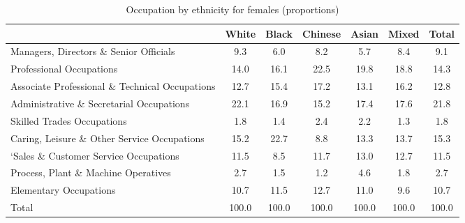 \begin{table}[htbp]\centering
\def\sym#1{\ifmmode^{#1}\else\(^{#1}\)\fi}
\caption{Occupation by ethnicity for females (proportions)}
\begin{tabular}{l*{6}{c}}
\hline\hline
          &    White&    Black&  Chinese&    Asian&    Mixed&    Total\\
\hline
Managers, Directors \& Senior Officials         &      9.3&      6.0&      8.2&      5.7&      8.4&      9.1\\
Professional Occupations         &     14.0&     16.1&     22.5&     19.8&     18.8&     14.3\\
Associate Professional \& Technical Occupations         &     12.7&     15.4&     17.2&     13.1&     16.2&     12.8\\
Administrative \& Secretarial Occupations         &     22.1&     16.9&     15.2&     17.4&     17.6&     21.8\\
Skilled Trades Occupations         &      1.8&      1.4&      2.4&      2.2&      1.3&      1.8\\
Caring, Leisure \& Other Service Occupations         &     15.2&     22.7&      8.8&     13.3&     13.7&     15.3\\
‘Sales \& Customer Service Occupations         &     11.5&      8.5&     11.7&     13.0&     12.7&     11.5\\
Process, Plant \& Machine Operatives         &      2.7&      1.5&      1.2&      4.6&      1.8&      2.7\\
Elementary Occupations         &     10.7&     11.5&     12.7&     11.0&      9.6&     10.7\\
Total     &    100.0&    100.0&    100.0&    100.0&    100.0&    100.0\\
\hline\hline
\end{tabular}
\end{table}
